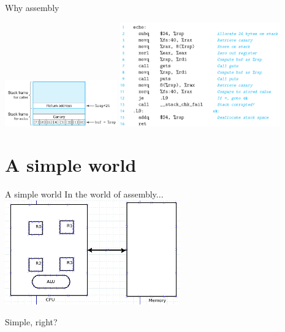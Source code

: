 \documentclass[UKenglish]{beamer}
\begin{document}
\begin{frame}{Why assembly}
  \begin{example}
    \includegraphics[width = \textwidth, height=2cm]{canary.png}
    \includegraphics[width = \textwidth, height=4.5cm]{canary_assembly.png}
  \end{example}
\end{frame}

\section{A simple world}
\begin{frame}{A simple world}
  In the world of assembly...
  \includegraphics[width = \textwidth, height=4.5cm]{simple.png}
  \begin{center}
   \Huge Simple, right?
  \end{center}
\end{frame}
\end{document}

